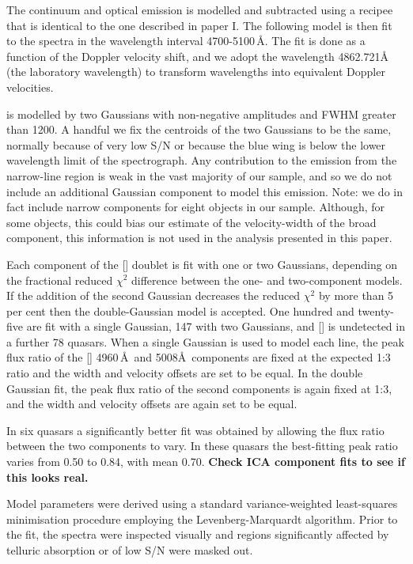 The continuum and optical  emission is modelled and subtracted using a recipee that is identical to the one described in paper I. 
The following model is then fit to the spectra in the wavelength interval 4700-5100\,\AA.
The fit is done as a function of the Doppler velocity shift, and we adopt the wavelength 4862.721\AA\, (the laboratory \hb wavelength) to transform wavelengths into equivalent Doppler velocities.

\hb is modelled by two Gaussians with non-negative amplitudes and FWHM greater than 1200\kms.
A handful we fix the centroids of the two Gaussians to be the same, normally because of very low S/N or because the blue wing is below the lower wavelength limit of the spectrograph. 
Any contribution to the \hb emission from the narrow-line region is weak in the vast majority of our sample, and so we do not include an additional Gaussian component to model this emission. 
Note: we do in fact include narrow components for eight objects in our sample. 
Although, for some objects, this could bias our estimate of the velocity-width of the broad component, this information is not used in the analysis presented in this paper. 

Each component of the [] doublet is fit with one or two Gaussians, depending on the fractional reduced $\chi^2$ difference between the one- and two-component models. 
If the addition of the second Gaussian decreases the reduced $\chi^2$ by more than 5 per cent then the double-Gaussian model is accepted.
One hundred and twenty-five are fit with a single Gaussian, 147 with two Gaussians, and [] is undetected in a further 78 quasars.
When a single Gaussian is used to model each line, the peak flux ratio of the [] 4960\,\AA\, and 5008\AA\, components are fixed at the expected 1:3 ratio and the width and velocity offsets are set to be equal.
In the double Gaussian fit, the peak flux ratio of the second components is again fixed at 1:3, and the width and velocity offsets are again set to be equal. 

In six quasars a significantly better fit was obtained by allowing the flux ratio between the two components to vary.
In these quasars the best-fitting peak ratio varies from 0.50 to 0.84, with mean 0.70.
{\bf Check ICA component fits to see if this looks real.}

Model parameters were derived using a standard variance-weighted least-squares minimisation procedure employing the Levenberg-Marquardt algorithm. 
Prior to the fit, the spectra were inspected visually and regions significantly affected by telluric absorption or of low S/N were masked out.

